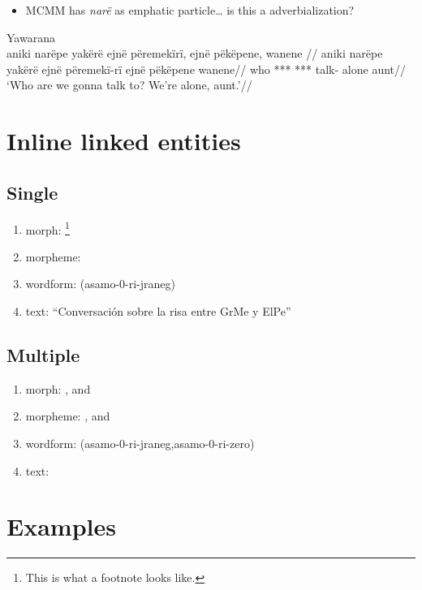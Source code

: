 \documentclass{memoir}
\begin{document}
\begin{itemize}
\tightlist
\item
  MCMM has \emph{narë} as emphatic particle\ldots{} is this a
  adverbialization?
\end{itemize}

\ex Yawarana \\
\label{convrisamaj-47}    \begingl
    \glpreamble  aniki narëpe yakërë ejnë përemekïrï, ejnë pëkëpene, wanene //
    \gla aniki narëpe yakërë ejnë përemekï-rï ejnë pëkëpene wanene//
    \glb who *** ***  talk-  alone aunt//
        \glft ‘Who are we gonna talk to? We’re alone, aunt.’//  
    \endgl 
\xe

\section{Inline linked entities}

\subsection{Single}

\begin{enumerate}
\def\labelenumi{\arabic{enumi}.}
\tightlist
\item
  morph: \footnote{This is what a footnote looks like.}
\item
  morpheme: 
\item
  wordform: (asamo-0-ri-jraneg)
\item
  text: ``Conversación sobre la risa entre GrMe y ElPe''
\end{enumerate}

\subsection{Multiple}

\begin{enumerate}
\def\labelenumi{\arabic{enumi}.}
\tightlist
\item
  morph: , and 
\item
  morpheme: , and 
\item
  wordform: (asamo-0-ri-jraneg,asamo-0-ri-zero)
\item
  text:
\end{enumerate}

\section{Examples}
\end{document}

